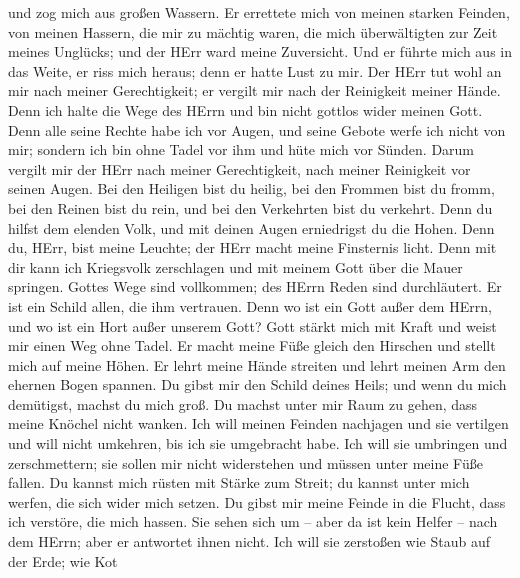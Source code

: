 und zog mich aus großen Wassern.  Er errettete mich von
meinen starken Feinden, von meinen Hassern, die mir zu mächtig waren,
 die mich überwältigten zur Zeit meines Unglücks; und der
HErr ward meine Zuversicht.  Und er führte mich aus in
das Weite, er riss mich heraus; denn er hatte Lust zu mir.
 Der HErr tut wohl an mir nach meiner Gerechtigkeit; er
vergilt mir nach der Reinigkeit meiner Hände.  Denn ich
halte die Wege des HErrn und bin nicht gottlos wider meinen Gott.
 Denn alle seine Rechte habe ich vor Augen, und seine
Gebote werfe ich nicht von mir;  sondern ich bin ohne
Tadel vor ihm und hüte mich vor Sünden.  Darum vergilt
mir der HErr nach meiner Gerechtigkeit, nach meiner Reinigkeit vor
seinen Augen.  Bei den Heiligen bist du heilig, bei den
Frommen bist du fromm,  bei den Reinen bist du rein, und
bei den Verkehrten bist du verkehrt.  Denn du hilfst dem
elenden Volk, und mit deinen Augen erniedrigst du die Hohen.
 Denn du, HErr, bist meine Leuchte; der HErr macht meine
Finsternis licht.  Denn mit dir kann ich Kriegsvolk
zerschlagen und mit meinem Gott über die Mauer springen. 
Gottes Wege sind vollkommen; des HErrn Reden sind durchläutert. Er ist
ein Schild allen, die ihm vertrauen.  Denn wo ist ein
Gott außer dem HErrn, und wo ist ein Hort außer unserem Gott?
 Gott stärkt mich mit Kraft und weist mir einen Weg ohne
Tadel.  Er macht meine Füße gleich den Hirschen und
stellt mich auf meine Höhen.  Er lehrt meine Hände
streiten und lehrt meinen Arm den ehernen Bogen spannen. 
Du gibst mir den Schild deines Heils; und wenn du mich demütigst, machst
du mich groß.  Du machst unter mir Raum zu gehen, dass
meine Knöchel nicht wanken.  Ich will meinen Feinden
nachjagen und sie vertilgen und will nicht umkehren, bis ich sie
umgebracht habe.  Ich will sie umbringen und
zerschmettern; sie sollen mir nicht widerstehen und müssen unter meine
Füße fallen.  Du kannst mich rüsten mit Stärke zum
Streit; du kannst unter mich werfen, die sich wider mich setzen.
 Du gibst mir meine Feinde in die Flucht, dass ich
verstöre, die mich hassen.  Sie sehen sich um -- aber da
ist kein Helfer -- nach dem HErrn; aber er antwortet ihnen nicht.
 Ich will sie zerstoßen wie Staub auf der Erde; wie Kot
